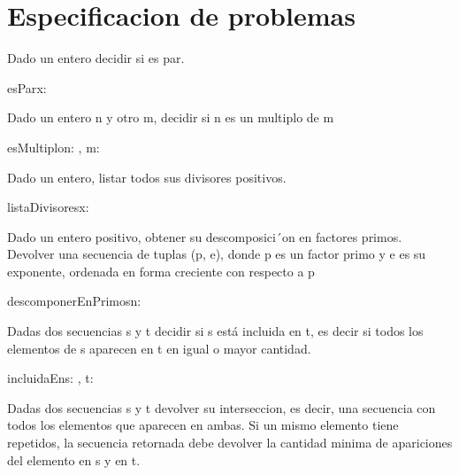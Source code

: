 \documentclass[10pt,a4paper]{article}
\begin{document}
\section*{Especificacion de problemas}
Dado un entero decidir si es par.
\begin{proc}{esPar}{\In x:\ent}{\bool}
    \requiere{\True}
\end{proc}
Dado un entero n y otro m, decidir si n es un multiplo de m
\begin{proc}{esMultiplo}{\In n: \ent, \In m: \ent}{\bool}
    \requiere{\True}
\end{proc}
Dado un entero, listar todos sus divisores positivos.
\begin{proc}{listaDivisores}{\In x: \ent}{\TLista{\ent}}
\requiere{\True}
\end{proc}
Dado un entero positivo, obtener su descomposici´on en factores primos. Devolver una secuencia de tuplas (p, e), donde p es
un factor primo y e es su exponente, ordenada en forma creciente con respecto a p
\begin{proc}{descomponerEnPrimos}{\In n: \nat}{\TLista{\ent \times \ent}}
    \requiere{\True}
\end{proc}
Dadas dos secuencias s y t decidir si s está incluida en t, es decir si todos los elementos de s aparecen en t en igual o mayor cantidad.
\begin{proc}{incluidaEn}{\In s: , \In t: }{\bool}
    \requiere{\True}
\end{proc}
Dadas dos secuencias s y t devolver su interseccion, es decir, una secuencia con todos los elementos que aparecen en ambas. Si un mismo elemento tiene repetidos, la secuencia retornada debe devolver la cantidad minima de apariciones del elemento en s y en t.
\end{document}

